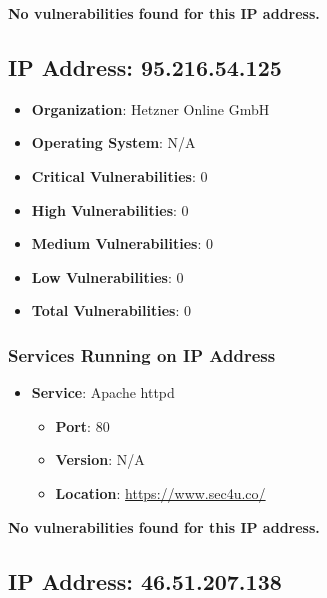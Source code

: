 \documentclass{article}
\begin{document}
\textbf{No vulnerabilities found for this IP address.}




\clearpage



\subsection*{IP Address: 95.216.54.125}

\begin{itemize}
    \item \textbf{Organization}: Hetzner Online GmbH
    \item \textbf{Operating System}:  N/A 
    \item \textbf{Critical Vulnerabilities}: 0
    \item \textbf{High Vulnerabilities}: 0
    \item \textbf{Medium Vulnerabilities}: 0
    \item \textbf{Low Vulnerabilities}: 0
    \item \textbf{Total Vulnerabilities}: 0
\end{itemize}

\subsubsection*{Services Running on IP Address}

\begin{itemize}
    
        \item \textbf{Service}: Apache httpd
        \begin{itemize}
            \item \textbf{Port}: 80
            \item \textbf{Version}:  N/A 
            \item \textbf{Location}: \href{ https://www.sec4u.co/ }{ https://www.sec4u.co/ }
        \end{itemize}
    
\end{itemize}


\textbf{No vulnerabilities found for this IP address.}




\clearpage



\subsection*{IP Address: 46.51.207.138}
\end{document}

